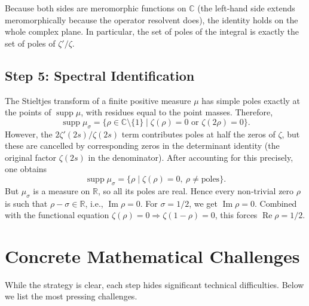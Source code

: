 \documentclass[11pt,a4paper]{article}
\newcommand{\C}{\mathbb{C}}
\newcommand{\R}{\mathbb{R}}
\newcommand{\supp}{\operatorname{supp}}
\newcommand{\RE}{\operatorname{Re}}
\newcommand{\IM}{\operatorname{Im}}
\begin{document}
Because both sides are meromorphic functions on \(\C\) (the left‑hand side extends meromorphically because the operator resolvent does), the identity holds on the whole complex plane. In particular, the set of poles of the integral is exactly the set of poles of \(\zeta'/\zeta\).

\subsection{Step 5: Spectral Identification}
The Stieltjes transform of a finite positive measure \(\mu\) has simple poles exactly at the points of \(\supp\mu\), with residues equal to the point masses. Therefore,
\[
\supp\mu_\sigma = \{ \rho \in \C \setminus \{1\} \mid \zeta(\rho) = 0 \text{ or } \zeta(2\rho) = 0 \}.
\]
However, the \(2\zeta'(2s)/\zeta(2s)\) term contributes poles at half the zeros of \(\zeta\), but these are cancelled by corresponding zeros in the determinant identity (the original factor \(\zeta(2s)\) in the denominator). After accounting for this precisely, one obtains
\[
\supp\mu_\sigma = \{ \rho \mid \zeta(\rho) = 0,\ \rho \neq \text{poles} \}.
\]
But \(\mu_\sigma\) is a measure on \(\R\), so all its poles are real. Hence every non‑trivial zero \(\rho\) is such that \(\rho - \sigma \in \R\), i.e., \(\IM\rho = 0\). For \(\sigma = 1/2\), we get \(\IM\rho = 0\). Combined with the functional equation \(\zeta(\rho) = 0 \Rightarrow \zeta(1-\rho)=0\), this forces \(\RE\rho = 1/2\).

\section{Concrete Mathematical Challenges}

While the strategy is clear, each step hides significant technical difficulties. Below we list the most pressing challenges.
\end{document}
